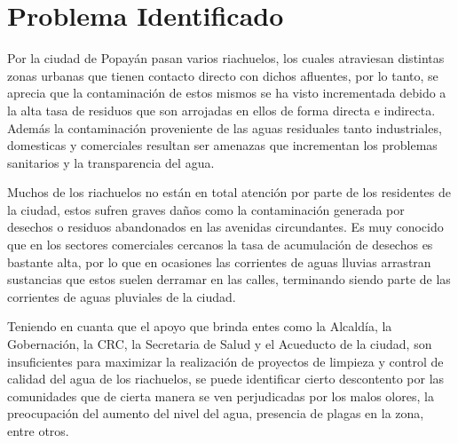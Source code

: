 \section{Problema Identificado}

Por la ciudad de Popayán pasan varios riachuelos, los cuales atraviesan distintas zonas urbanas que tienen contacto directo con dichos afluentes, por lo tanto, se aprecia que la contaminación de estos mismos se ha visto incrementada debido a la alta tasa de residuos que son arrojadas en ellos de forma directa e indirecta. Además la contaminación proveniente de las aguas residuales tanto industriales, domesticas y comerciales resultan ser amenazas que incrementan los problemas sanitarios y la transparencia del agua.

Muchos de los riachuelos no están en total atención por parte de los residentes de la ciudad, estos sufren graves daños como la contaminación generada por desechos o residuos abandonados en las avenidas circundantes. Es muy conocido que en los sectores comerciales cercanos la tasa de acumulación de desechos es bastante alta, por lo que en ocasiones las corrientes de aguas lluvias arrastran sustancias que estos suelen derramar en las calles, terminando siendo parte de las corrientes de aguas pluviales de la ciudad.

Teniendo en cuanta que el apoyo que brinda entes como la Alcaldía, la Gobernación, la CRC, la Secretaria de Salud y el Acueducto de la ciudad, son insuficientes para maximizar la realización de proyectos de limpieza y control de calidad del agua de los riachuelos, se puede identificar cierto descontento por las comunidades que de cierta manera se ven perjudicadas por los malos olores, la preocupación del aumento del nivel del agua, presencia de plagas en la zona, entre otros.

